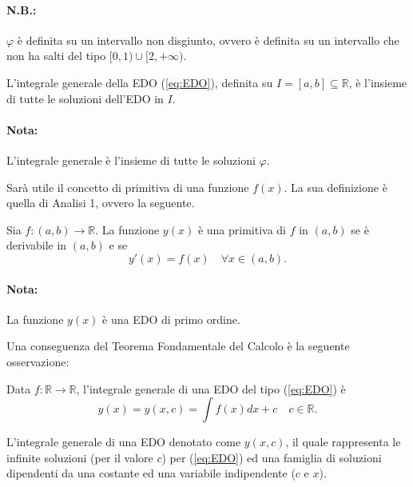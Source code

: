 \paragraph{N.B.:} $\varphi$ è definita su un intervallo non disgiunto, ovvero è definita su un intervallo che non ha salti del tipo $[0,1)\cup[2, +\infty)$.

\begin{definition}\label{def:integrale_generale_EDO}
    L'integrale generale della EDO (\ref{eq:EDO}), definita su $I=[a,b]\subseteq \mathbb R$, è l'insieme di tutte le soluzioni dell'EDO in $I$.
\end{definition}

\paragraph{Nota:} L'integrale generale è l'insieme di tutte le soluzioni $\varphi$.

Sarà utile il concetto di primitiva di una funzione $f(x)$. La sua definizione è quella di Analisi 1, ovvero la seguente.

\begin{definition}[Primitiva]
    Sia $f\colon (a,b)\rightarrow\mathbb R$. La funzione $y(x)$ è una primitiva di $f$ in $(a,b)$ se è derivabile in $(a,b)$ e se
    \begin{equation*}
        y'(x)=f(x)\quad\forall x\in(a,b).
    \end{equation*}
\end{definition}

\paragraph{Nota:} La funzione $y(x)$ è una EDO di primo ordine.

Una conseguenza del Teorema Fondamentale del Calcolo è la seguente osservazione:
\begin{remark}
    Data $f\colon\mathbb R \rightarrow \mathbb R$, l'integrale generale di una EDO del tipo (\ref{eq:EDO}) è
    \begin{equation}\label{eq:primitiva}
        y(x)=y(x,c)=\int f(x) dx+c\quad c\in\mathbb R.
    \end{equation}
\end{remark} 

L'integrale generale di una EDO denotato come $y(x,c)$, il quale rappresenta le infinite soluzioni (per il valore $c$) per (\ref{eq:EDO}) ed una famiglia di soluzioni dipendenti da una costante ed una variabile indipendente ($c$ e $x$).

